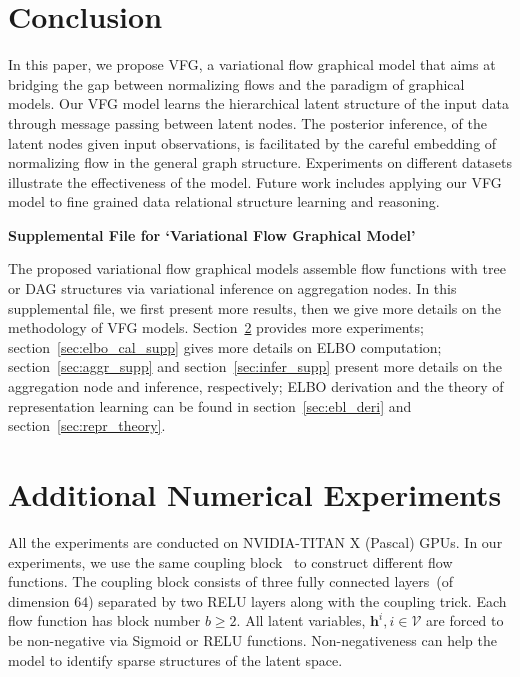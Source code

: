 \documentclass[twoside]{article}
\begin{document}
\section{Conclusion}\label{sec:conclusion}
\vspace{-0.05in}
In this paper, we propose VFG, a variational flow graphical model that aims at bridging the gap between normalizing flows and the paradigm of graphical models.
Our VFG model learns the hierarchical latent structure of the input data through message passing between latent nodes.
The posterior inference, of the latent nodes given input observations, is facilitated by the careful embedding of normalizing flow in the general graph structure.
Experiments on different datasets illustrate the effectiveness of the model. 
Future work includes applying our VFG model to fine grained data relational structure learning and reasoning. 





\newpage
\appendix
\onecolumn

\begin{center}
{\LARGE \textbf{Supplemental File for `Variational Flow Graphical Model'}}
\end{center}

The proposed variational flow graphical models assemble flow functions with tree or DAG structures via variational inference on aggregation nodes. In this supplemental file, we first present more results, then we give more details on  the methodology of VFG models. Section~\ref{sec:exp_supp} provides more experiments; section~\ref{sec:elbo_cal_supp} gives more details on ELBO computation; section~\ref{sec:aggr_supp} and section~\ref{sec:infer_supp} present more details on the aggregation node and inference, respectively; ELBO derivation and the theory of representation learning can be found in section~\ref{sec:ebl_deri} and section~\ref{sec:repr_theory}. 


\section{Additional Numerical Experiments}\label{sec:exp_supp}
All the experiments are conducted on NVIDIA-TITAN X (Pascal) GPUs. 
In  our experiments, we use the same  coupling block~\cite{Dinh2016DensityEU} to construct different flow functions. 
The coupling block consists of three fully connected layers~(of dimension $64$) separated by two RELU layers along with the coupling trick. 
Each flow function has block number $b\geqslant 2$. 
All latent variables, $\mathbf{h}^{i}, i \in \mathcal{V}$ are forced to be non-negative via Sigmoid or RELU functions. 
Non-negativeness can help the model to identify sparse structures of the latent space. 
\end{document}
